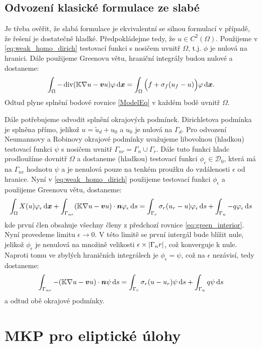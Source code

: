 \subsection{Odvození klasické formulace ze slabé}
Je třeba ověřit, že slabá formulace je ekvivalentní se silnou formulací v případě, že řešení je dostatečně hladké. Předpokládejme tedy, že $u\in C^2(\Omega)$.
Použijeme v \eqref{eq:weak_homo_dirich} testovací funkci s nosičem uvnitř $\Omega$, t.j. $\phi$ je nulová na hranici. Dále použijeme Greenovu větu, 
hraniční integrály budou nulové a dostaneme:
\begin{equation}
    \label{eq:green_interior}
    \int_\Omega -\operatorname{div} ({\mathbb{K}}\nabla u-\mathbf{\boldsymbol{v}} u) \varphi \,{\rm d} \mathbf{\boldsymbol{x}} = \int_\Omega \Big(f + \sigma_f (u_f - u)\Big)\varphi \,{\rm d} \mathbf{\boldsymbol{x}}.
\end{equation}
Odtud plyne splnění bodové rovnice \eqref{ModelEq} v každém bodě uvnitř $\Omega$.

Dále potřebujeme odvodit splnění okrajových podmínek. Dirichletova podmínka je splněna přímo, jelikož $u=\tilde u_d + u_0$ a $u_0$ je nulová na $\Gamma_d$.
Pro odvození Neumannovy a Robinovy okrajové podmínky uvažujeme libovolnou (hladkou) testovací funkci $\psi$ s nosičem uvnitř $\Gamma_{nr} =\Gamma_n \cup \Gamma_r$. 
Dále tuto funkci hladc prodloužíme dovnitř  $\Omega$ a dostaneme  (hladkou) testovací funkci $\phi_\epsilon \in \mathcal D_0$, která má na 
$\Gamma_{nr}$ hodnotu $\psi$ a je nenulová pouze na tenkém proužku do vzdálenosti $\epsilon$ od hranice.
Nyní v \eqref{eq:weak_homo_dirich} použijeme testovací funkci $\phi_\epsilon$ a použijeme Greenovu větu, dostaneme:
\[
    \int_\Omega X(u)\varphi_\epsilon \,{\rm d} \mathbf{\boldsymbol{x}} + \int_{\Gamma_{nr}} ({\mathbb{K}}\nabla u-\mathbf{\boldsymbol{v}} u)\cdot \mathbf{\boldsymbol{n}} \varphi_\epsilon \,{\rm d} s    
              =  \int_{\Gamma_r} \sigma_r (u_r -u) \varphi_\epsilon \,{\rm d} s + \int_{\Gamma_n} -q \varphi_\epsilon \,{\rm d} s 
\]
kde první člen obsahuje všechny členy z předchozí rovnice \eqref{eq:green_interior}. Nyní provedeme limitu $\epsilon \to 0$. V této limitě se první intergál 
bude blížit nule, jelikož $\phi_\epsilon$ je nenulová na množině velikosti $\epsilon \times \lvert\Gamma_nr\rvert$, což konverguje k nule. Naproti tomu ve zbylých 
hraničních integrálech je $\phi_\epsilon = \psi$, což na $\epsilon$ nezávisí, tedy dostaneme:
\[
    \int_{\Gamma_{nr}} -({\mathbb{K}}\nabla u-\mathbf{\boldsymbol{v}} u)\cdot \mathbf{\boldsymbol{n}} \psi \,{\rm d} s  
              =  \int_{\Gamma_r} \sigma_r (u -u_r) \psi \,{\rm d} s + \int_{\Gamma_n} q \psi \,{\rm d} s 
\]
a odtud obě okrajové podmínky.

\section{MKP pro eliptické úlohy}
